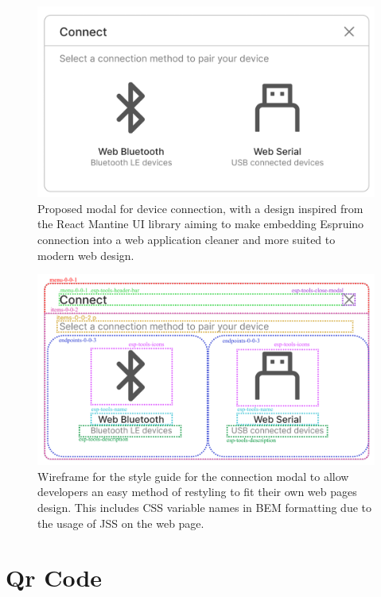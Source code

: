 \documentclass{l4proj}
\begin{document}
\begin{appendices}
\begin{figure}[H]
    \centering
    \includegraphics[width=12cm]{dissertation/images/wireframe-connection.png}
    \caption{Proposed modal for device connection, with a design inspired from the React Mantine UI library aiming to make embedding Espruino connection into a web application cleaner and more suited to modern web design.}
    \label{fig:connection-wireframe}
\end{figure}

\begin{figure}[H]
    \centering
    \includegraphics[width=12cm]{dissertation/images/wireframe-connection-style-guide.png}
    \caption{Wireframe for the style guide for the connection modal to allow developers an easy method of restyling to fit their own web pages design. This includes CSS variable names in BEM formatting due to the usage of JSS on the web page.}
    \label{fig:connection-style-wireframe}
\end{figure}

\section{Qr Code}


\end{appendices}
\end{document}
